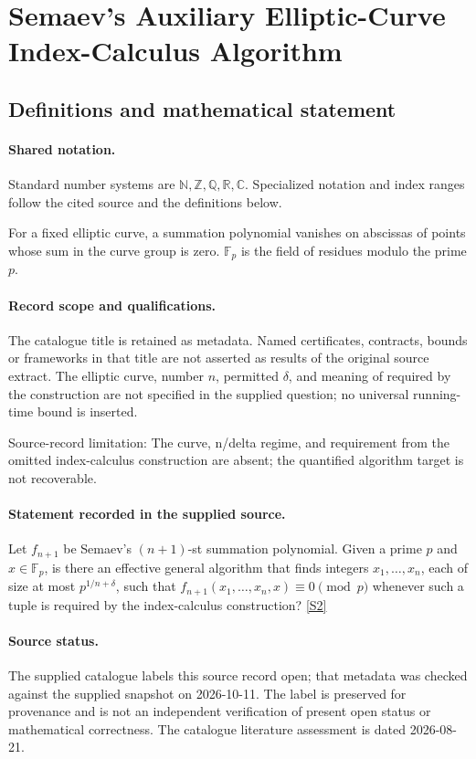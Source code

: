 \documentclass[11pt]{article}
\newcommand{\sref}[2]{\hyperlink{source:#1:#2}{[S#2]}}
\begin{document}
\section{Semaev's Auxiliary Elliptic-Curve Index-Calculus Algorithm}\label{statement}

\subsection{Definitions and mathematical statement}

\paragraph{Shared notation.}Standard number systems are $\mathbb N,\mathbb Z,\mathbb Q,\mathbb R,\mathbb C$. Specialized notation and index ranges follow the cited source and the definitions below.


For a fixed elliptic curve, a summation polynomial vanishes on abscissas of points whose sum in the curve group is zero. $\mathbb F_p$ is the field of residues modulo the prime $p$.
\paragraph{Record scope and qualifications.}
The catalogue title is retained as metadata. Named certificates, contracts, bounds or frameworks in that title are not asserted as results of the original source extract.
The elliptic curve, number $n$, permitted $\delta$, and meaning of required by the construction are not specified in the supplied question; no universal running-time bound is inserted.

Source-record limitation: The curve, n/delta regime, and requirement from the omitted index-calculus construction are absent; the quantified algorithm target is not recoverable.
\paragraph{Statement recorded in the supplied source.}
Let $f_{n+1}$ be Semaev's $(n+1)$-st summation polynomial. Given a prime $p$ and $x\in\mathbb{F}_p$, is there an effective general algorithm that finds integers $x_1,\ldots,x_n$, each of size at most $p^{1/n+\delta}$, such that $f_{n+1}(x_1,\ldots,x_n,x)\equiv0\pmod p$ whenever such a tuple is required by the index-calculus construction? \sref{statement}{2}
\paragraph{Source status.}
The supplied catalogue labels this source record open; that metadata was checked against the supplied snapshot on 2026-10-11. The label is preserved for provenance and is not an independent verification of present open status or mathematical correctness. The catalogue literature assessment is dated 2026-08-21.
\end{document}
